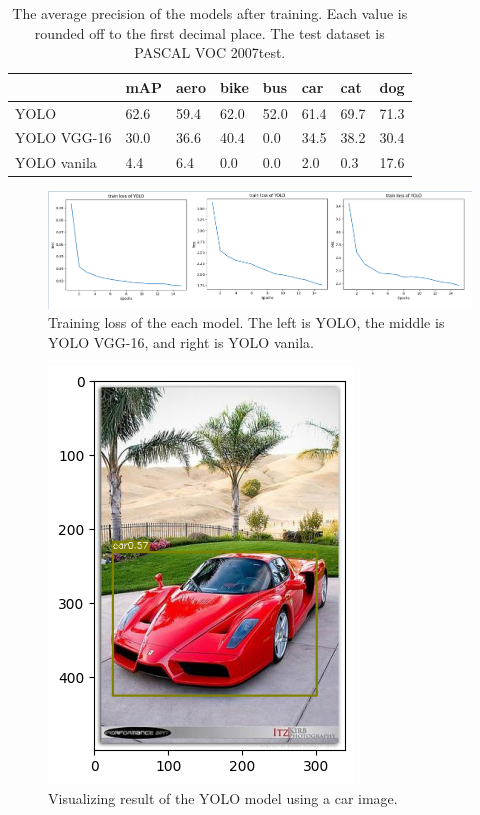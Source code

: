 \documentclass[extendedabs]{bmvc2k}
\begin{document}
\begin{table}[]
\centering
\begin{tabular}{l|l|llllll}
            & mAP  & aero & bike & bus  & car  & cat  & dog  \\ \hline
YOLO        & 62.6 & 59.4 & 62.0 & 52.0 & 61.4 & 69.7 & 71.3 \\
YOLO VGG-16 & 30.0 & 36.6 & 40.4 & 0.0  & 34.5 & 38.2 & 30.4 \\
YOLO vanila & 4.4 & 6.4 & 0.0  & 0.0  & 2.0  & 0.3 & 17.6 
\end{tabular}
\caption{The average precision of the models after training. Each value is rounded off to the first decimal place. The test dataset is PASCAL VOC 2007test.}
\label{tab:results}
\end{table}

\begin{figure}[t]
	\includegraphics[width=\linewidth]{images/losschart.PNG}
	\caption{Training loss of the each model. The left is YOLO, the middle is YOLO VGG-16, and right is YOLO vanila.
		}
	\vspace{-2mm}
        \label{fig:losschart}
\end{figure}

\begin{figure}[t]
	\includegraphics[width=0.5\linewidth]{images/infercar.png}
	\caption{Visualizing result of the YOLO model using a car image.
		}
	\vspace{-2mm}
        \label{fig:infercar}
\end{figure}
\end{document}
